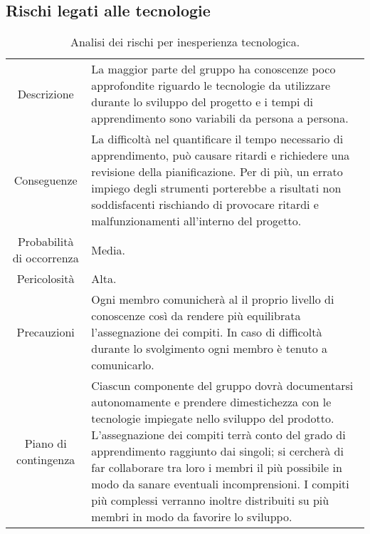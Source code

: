 \subsection{Rischi legati alle tecnologie}
\begin{table} [H]
	\begin{tabular}{|c|p{11.5cm}|}
	\rowcolor{darkblue} \hline
	\multicolumn{2}{|c|}{\textcolor{white}{\textbf{RT1 - Inesperienza tecnologica}}}\\ \hline
	Descrizione & La maggior parte del gruppo ha conoscenze poco approfondite riguardo le tecnologie da utilizzare durante lo sviluppo del progetto e i tempi di apprendimento sono variabili da persona a persona.\\ \hline
	Conseguenze & La difficoltà nel quantificare il tempo necessario di apprendimento, può causare ritardi e richiedere una revisione della pianificazione. Per di più, un errato impiego degli strumenti porterebbe a risultati non soddisfacenti rischiando di provocare ritardi e malfunzionamenti all'interno del progetto.\\ \hline
	Probabilità di occorrenza & Media.\\ \hline
	Pericolosità & Alta.\\ \hline
	Precauzioni & Ogni membro comunicherà al {\Responsabile} il proprio livello di conoscenze così da rendere più equilibrata l'assegnazione dei compiti. In caso di difficoltà durante lo svolgimento ogni membro è tenuto a comunicarlo.\\ \hline
	Piano di contingenza & Ciascun componente del gruppo dovrà documentarsi autonomamente e prendere dimestichezza con le tecnologie impiegate nello sviluppo del prodotto. L’assegnazione dei compiti terrà conto del grado di apprendimento raggiunto dai singoli; si cercherà di far collaborare tra loro i membri il più possibile in modo da sanare eventuali incomprensioni. I compiti più complessi verranno inoltre distribuiti su più membri in modo da favorire lo sviluppo.\\ \hline
	\end{tabular}
	\caption{\label{tab:RT1}Analisi dei rischi per inesperienza tecnologica.}
\end{table}

